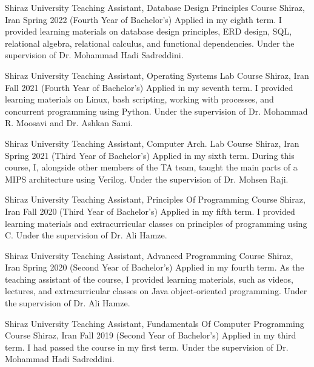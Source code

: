 

\begin{cventries}

  \cventry
    {Shiraz University} %
    {Teaching Assistant, Database Design Principles Course} %
    {Shiraz, Iran} %
    {Spring 2022 (Fourth Year of Bachelor's)} %
    {
      Applied in my eighth term. I provided learning materials on database design principles, ERD design,  SQL, relational algebra, relational calculus, and functional dependencies. Under the supervision of Dr. Mohammad Hadi Sadreddini.
    }

  \cventry
    {Shiraz University} %
    {Teaching Assistant, Operating Systems Lab Course} %
    {Shiraz, Iran} %
    {Fall 2021 (Fourth Year of Bachelor’s)} %
    {
        Applied in my seventh term. I provided learning materials on Linux, bash scripting, working with processes, and concurrent programming using Python. Under the supervision of Dr. Mohammad R. Moosavi and Dr. Ashkan Sami.
    }

    \cventry
    {Shiraz University} %
    {Teaching Assistant, Computer Arch. Lab Course} %
    {Shiraz, Iran} %
    {Spring 2021 (Third Year of Bachelor’s)} %
    {
        Applied in my sixth term. During this course, I, alongside other members of the TA team, taught the main parts of a MIPS architecture using Verilog. Under the supervision of Dr. Mohsen Raji.
    }

    \cventry
    {Shiraz University} %
    {Teaching Assistant, Principles Of Programming Course} %
    {Shiraz, Iran} %
    {Fall 2020 (Third Year of Bachelor’s)} %
    {
        Applied in my fifth term. I provided learning materials and extracurricular classes on principles of programming using C. Under the supervision of Dr. Ali Hamze.
    }

    \cventry
    {Shiraz University} %
    {Teaching Assistant, Advanced Programming Course} %
    {Shiraz, Iran} %
    {Spring 2020 (Second Year of Bachelor’s)} %
    {
        Applied in my fourth term. As the teaching assistant of the course, I provided learning materials, such as videos, lectures, and extracurricular classes on Java object-oriented programming. Under the supervision of Dr. Ali Hamze.
    }

    \cventry
    {Shiraz University} %
    {Teaching Assistant, Fundamentals Of Computer Programming Course} %
    {Shiraz, Iran} %
    {Fall 2019 (Second Year of Bachelor’s)} %
    {
        Applied in my third term. I had passed the course in my first term. Under the supervision of Dr. Mohammad Hadi Sadreddini.
    }

\end{cventries}

